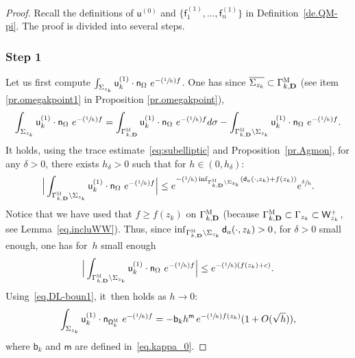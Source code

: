\documentclass[10pt]{amsart}
\newcommand{\Psfrac}[2]{(\sfrac{#1}{#2})}
\newcommand{\mbf}[1]{\mathbf{#1}}
\theoremstyle{plain}
\theoremstyle{definition}
\begin{document}
\begin{proof} Recall the definitions of $\mathsf u^{(0)}$
and $\{\mathsf f_1^{(1)}, \ldots, \mathsf f_n^{(1)}\} $ in Definition~\ref{de.QM-pi}.
The proof is divided into several steps.

\subsubsection*{Step 1} Let us first compute $ \int_{\Sigma_{z_k}} \mathsf u_k^{(1)} \cdot \mathsf n_\Omega \ e^{- \Psfrac{1}{h} f} $. One has since $\overline{\Sigma_{z_k}} \subset \Gamma_{k,\mbf D}^{ \textsc{M} }$ (see item \eqref{pr.omegakpoint1} in Proposition \ref{pr.omegakpoint}),
\begin{align*}
\int_{\Sigma_{z_k}} \mathsf u_k^{(1)} \cdot \mathsf n_\Omega \ e^{- \Psfrac{1}{h} f} = \int_{\Gamma_{k,\mbf D}^{ \textsc{M} } } \mathsf u_k^{(1)} \cdot \mathsf n_\Omega \ e^{- \Psfrac{1}{h} f} d\sigma - \int_{\Gamma_{k,\mbf D}^{ \textsc{M} } \setminus \Sigma_{z_k} } \mathsf u_k^{(1)} \cdot \mathsf n_\Omega \ e^{- \Psfrac{1}{h} f}.
\end{align*}
It holds, using the trace estimate~\eqref{eq:subelliptic} and Proposition~\ref{pr.Agmon}, for any $\delta>0$, there exists $h_\delta>0$ such that for $h\in (0,h_\delta)$:
\[
\Big \vert \int_{\Gamma_{k,\mbf D}^{ \textsc{M} } \setminus \Sigma_{z_k} } \mathsf u_k^{(1)} \cdot \mathsf n_\Omega \ e^{- \Psfrac{1}{h} f} \Big \vert \le e^{-\Psfrac 1h \inf_{\Gamma_{k,\mbf D}^{ \textsc{M} } \setminus \Sigma_{z_k}}(\mathsf d_a(\cdot, z_k)+f(z_k))} e^{\sfrac{ \delta }{h}}.
\]
Notice that we have used that $f\ge f(z_k)$ on $\Gamma_{k,\mbf D}^{ \textsc{M} }$ (because $\Gamma_{k,\mbf D}^{ \textsc{M} }\subset \Gamma_{z_k} \subset \mathsf W_{z_k}^+$, see Lemma~\ref{eq.incluWW}).
Thus, since $\inf_{\Gamma_{k,\mbf D}^{ \textsc{M} } \setminus \Sigma_{z_k}}\mathsf d_a(\cdot, z_k)>0$, for $\delta>0$ small enough, one has for~$h$ small enough
\begin{align}\label{eq.ici2}
\Big \vert \int_{\Gamma_{k,\mbf D}^{ \textsc{M} } \setminus \Sigma_{z_k} } \mathsf u_k^{(1)} \cdot \mathsf n_\Omega \ e^{- \Psfrac{1}{h} f} \Big \vert \le e^{-\Psfrac 1h (f(z_k)+c)}.
\end{align}
Using~\eqref{eq.DL-boun1}, it~then holds as $h\to 0$:
\begin{align*}
\int_{\Sigma_{z_k}}\mathsf u^{(1)}_k \cdot \mathsf n_{ \mathsf \Omega_k^{\textsc{M}} }\ e^{-\Psfrac 1hf}=-\mathsf b_k h^{\mathsf m} \, e^{-\Psfrac 1h f(z_k)} (1+O(\sqrt h)),
\end{align*}
where $\mathsf b_k$ and $\mathsf m$ are defined in~\eqref{eq.kappa_0}.


\end{proof}
\end{document}
